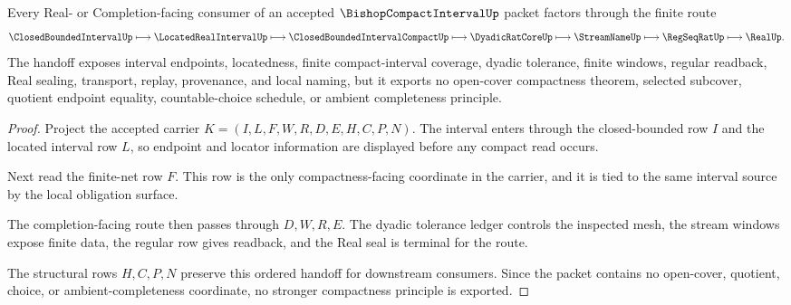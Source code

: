 \begin{theorem}
\label{thm:bishop-compact-interval-finite-net-handoff}
Every Real- or Completion-facing consumer of an accepted $\BishopCompactIntervalUp$ packet factors through the finite route
$$
\ClosedBoundedIntervalUp
\longmapsto
\LocatedRealIntervalUp
\longmapsto
\ClosedBoundedIntervalCompactUp
\longmapsto
\DyadicRatCoreUp
\longmapsto
\StreamNameUp
\longmapsto
\RegSeqRatUp
\longmapsto
\RealUp .
$$
The handoff exposes interval endpoints, locatedness, finite compact-interval coverage, dyadic tolerance, finite windows, regular readback, Real sealing, transport, replay, provenance, and local naming, but it exports no open-cover compactness theorem, selected subcover, quotient endpoint equality, countable-choice schedule, or ambient completeness principle.
\end{theorem}
\begin{proof}
Project the accepted carrier $K=(I,L,F,W,R,D,E,H,C,P,N)$. The interval enters through the closed-bounded row $I$ and the located interval row $L$, so endpoint and locator information are displayed before any compact read occurs.

Next read the finite-net row $F$. This row is the only compactness-facing coordinate in the carrier, and it is tied to the same interval source by the local obligation surface.

The completion-facing route then passes through $D,W,R,E$. The dyadic tolerance ledger controls the inspected mesh, the stream windows expose finite data, the regular row gives readback, and the Real seal is terminal for the route.

The structural rows $H,C,P,N$ preserve this ordered handoff for downstream consumers. Since the packet contains no open-cover, quotient, choice, or ambient-completeness coordinate, no stronger compactness principle is exported.
\end{proof}

